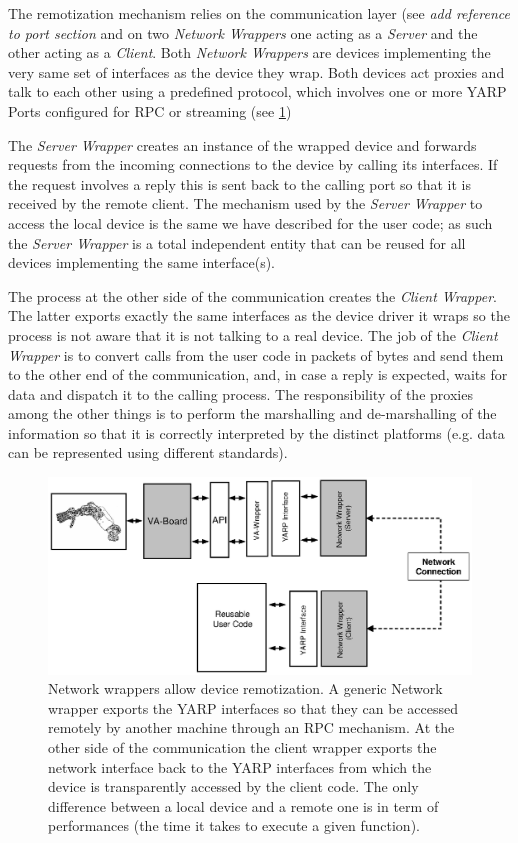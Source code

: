 The remotization mechanism relies on the communication layer (see \emph{add 
reference to port section} and on two \emph{Network Wrappers} one acting as a 
\emph{Server} and the other acting as a \emph{Client}. Both \emph{Network Wrappers} 
are devices implementing the very same set of interfaces as the device they wrap. 
Both devices act proxies and talk to each other using a predefined 
protocol, which involves one or more YARP Ports configured for RPC or streaming
(see \ref{fig:devices3})

The \emph{Server Wrapper} creates an instance of the wrapped device and forwards 
requests from the incoming connections to the device by calling its interfaces. 
If the request involves a reply this is sent back to the calling port so that it 
is received by the remote client. The mechanism used by the \emph{Server Wrapper} 
to access the local device is the same we have described for the user code; as 
such the \emph{Server Wrapper} is a total independent entity that can be reused 
for all devices implementing the same interface(s). 

The process at the other side of the communication creates the 
\emph{Client Wrapper}. The latter exports exactly the same interfaces as the 
device driver it wraps so the process is not aware that it is not talking to 
a real device. The job of the \emph{Client Wrapper} is to convert calls from 
the user code in packets of bytes and send them to the other end of the 
communication, and, in case a reply is expected, waits for data and dispatch 
it to the calling process. The responsibility of the proxies among the other 
things is to perform the marshalling and de-marshalling of the information 
so that it is correctly interpreted by the distinct platforms (e.g. data can 
be represented using different standards).


\begin{figure}[tbp]
\centerline{
\includegraphics[width=24cm]{fig-devices3.eps}
}
\caption{Network wrappers allow device remotization. A generic Network 
wrapper exports the YARP interfaces so that they can be accessed remotely 
by another machine through an RPC mechanism. At the other side of the 
communication the client wrapper exports the network interface back 
to the YARP interfaces from which the device is transparently accessed 
by the client code. The only difference between a local device and a 
remote one is in term of performances (the time it takes to execute 
a given function).
}\label{fig:devices3}
\end{figure}

